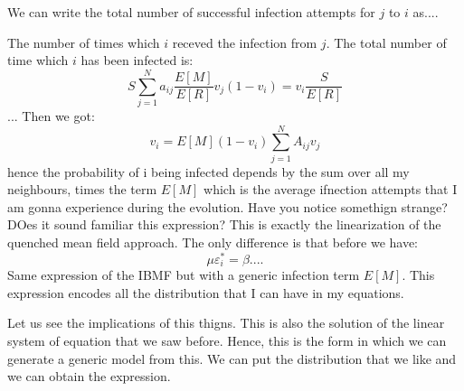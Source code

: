 \documentclass[../main/main.tex]{subfiles}
\begin{document}
We can write the total number of successful infection attempts for \(
j \) to \( i \) as....

The  number of times which \( i \) receved the infection from \( j \). The total number of time which \( i \) has been infected is:
\begin{equation*}
  S \sum_{j=1}^{N}  a_{ij} \frac{E[M]}{E[R]} v_{j} (1-v_i) = v_i \frac{S}{E[R]}
\end{equation*}
...
Then we got:
\begin{equation*}
  v_i = E[M] (1- v_i) \sum_{j=1}^{N} A_{ij} v_j
\end{equation*}
hence the probability of i being infected depends by the sum over all my neighbours, times the term \( E[M] \) which is the average ifnection attempts that I am gonna experience during the evolution.
Have you notice somethign strange? DOes it sound familiar this expression? This is exactly the linearization of the quenched mean field approach. The only difference is that before we have:
\begin{equation*}
  \mu \varepsilon _i^* = \beta ....
\end{equation*}
Same expression of the IBMF but with a generic infection term \( E[M] \). This expression encodes all the distribution that I can have in my equations.

Let us see the implications of this thigns. This is also the solution of the linear system of equation that we saw before. Hence, this is the form in which we can generate a generic model from this. We can put the distribution that we like and we can obtain the expression.
\end{document}
